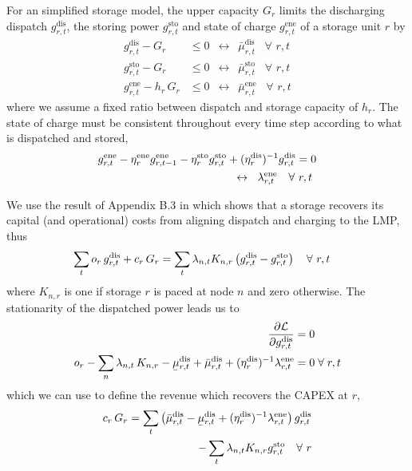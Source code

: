 \documentclass[11pt,twocolumn]{article}
\newcommand{\ubar}[1]{\underaccent{\bar}{#1}}
\newcommand{\resultsin}[1]{\hspace{6pt} \leftrightarrow  \hspace{6pt} #1}
\newcommand{\Forall}[1]{\hspace{10pt} \forall \,\, #1 }
\newcommand{\pdv}[2]{\frac{\partial #1}{\partial #2}}
\newcommand{\storage}{g_{r,t}}
\newcommand{\storagedispatch}{\storage^\text{dis}}
\newcommand{\storagecharge}{\storage^\text{sto}}
\newcommand{\storagesoc}{\storage^\text{ene}}
\newcommand{\storageprevioussoc}{g_{r,t-1}^\text{ene}}
\newcommand{\efficiency}{\eta_{r}}
\newcommand{\efficiencydispatch}{\efficiency^\text{dis}}
\newcommand{\efficiencycharge}{\efficiency^\text{sto}}
\newcommand{\efficiencysoc}{\efficiency^\text{ene}}
\newcommand{\operationalpricestorage}{o_r}
\newcommand{\capitalpricestorage}{c_r}
\newcommand{\capacitystorage}{G_r}
\newcommand{\mulowerstoragedispatch}{\ubar{\mu}_{r,t}^\text{dis}}
\newcommand{\muupperstoragedispatch}{\bar{\mu}_{r,t}^\text{dis}}
\newcommand{\muupperstoragecharge}{\bar{\mu}_{r,t}^\text{sto}}
\newcommand{\muupperstoragesoc}{\bar{\mu}_{r,t}^\text{ene}}
\newcommand{\mustateofcharge}{\lambda^\text{ene}_{r,t}}
\newcommand{\lagrangian}{\mathcal{L}}
\newcommand{\lmp}[1][n]{\lambda_{#1,t}}
\newcommand{\incidencestorage}[1][n]{K_{#1,r}}
\begin{document}
For an simplified storage model, the upper capacity $\capacitystorage$ limits the discharging dispatch $\storagedispatch$, the storing power $\storagecharge$ and state of charge $\storagesoc$ of a storage unit $r$ by 
\begin{align}
    \storagedispatch - \capacitystorage &\le 0  \resultsin{\muupperstoragedispatch} \Forall{r,t} \\
    \storagecharge - \capacitystorage &\le 0  \resultsin{\muupperstoragecharge} \Forall{r,t} \\
    \storagesoc - h_r \, \capacitystorage &\le 0  \resultsin{\muupperstoragesoc} \Forall{r,t}
\end{align}
where we assume a fixed ratio between dispatch and storage capacity of $h_r$. 
The state of charge must be consistent throughout every time step according to what is dispatched and stored, 
\begin{align}
    \notag
    \storagesoc - \efficiencysoc \storageprevioussoc - \efficiencycharge \storagecharge &+ (\efficiencydispatch)^{-1} \storagedispatch = 0 \\
    &\resultsin{\mustateofcharge} \Forall{r,t}
\end{align}



We use the result of Appendix B.3 in \cite{brown_decreasing_2020} which shows that a storage recovers its capital (and operational) costs from aligning dispatch and charging to the LMP, thus 
\begin{align}
    \notag
    \sum_t \operationalpricestorage \, \storagedispatch + \capitalpricestorage \, \capacitystorage = \sum_t \lmp \incidencestorage &\left(\storagedispatch - \storagecharge \right) \Forall{r,t}
\end{align}
where $\incidencestorage$ is one if storage $r$ is paced at node $n$ and zero otherwise. 
The stationarity of the dispatched power leads us to  
\begin{align}
    \notag
    \pdv{\lagrangian}{\storagedispatch} &= 0 \\
    \operationalpricestorage - \sum_n \lmp \, \incidencestorage - \mulowerstoragedispatch + \muupperstoragedispatch + (\efficiencydispatch )^{-1} \mustateofcharge &= 0 \;  \forall\; r,t
    \label{eq:stationarity_storagedispatch}
\end{align}
which we  can use to define the revenue which recovers the \ac{CAPEX} at $r$, 
\begin{align}
    \notag
    \capitalpricestorage \, \capacitystorage = \sum_t \left(\muupperstoragedispatch - \mulowerstoragedispatch  + (\efficiencydispatch )^{-1} \mustateofcharge \right) \storagedispatch \\
    - \sum_t \lmp \incidencestorage  \storagecharge \Forall{r} 
    \label{eq:no_profit_capex_storage2}
\end{align}
\end{document}
